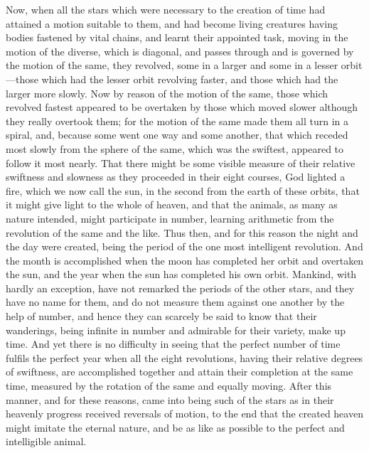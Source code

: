 \documentclass[11pt,letter]{article}
\begin{document}
\par  Now, when all the stars which were necessary to the creation of time had attained a motion suitable to them, and had become living creatures having bodies fastened by vital chains, and learnt their appointed task, moving in the motion of the diverse, which is diagonal, and passes through and is governed by the motion of the same, they revolved, some in a larger and some in a lesser orbit—those which had the lesser orbit revolving faster, and those which had the larger more slowly. Now by reason of the motion of the same, those which revolved fastest appeared to be overtaken by those which moved slower although they really overtook them; for the motion of the same made them all turn in a spiral, and, because some went one way and some another, that which receded most slowly from the sphere of the same, which was the swiftest, appeared to follow it most nearly. That there might be some visible measure of their relative swiftness and slowness as they proceeded in their eight courses, God lighted a fire, which we now call the sun, in the second from the earth of these orbits, that it might give light to the whole of heaven, and that the animals, as many as nature intended, might participate in number, learning arithmetic from the revolution of the same and the like. Thus then, and for this reason the night and the day were created, being the period of the one most intelligent revolution. And the month is accomplished when the moon has completed her orbit and overtaken the sun, and the year when the sun has completed his own orbit. Mankind, with hardly an exception, have not remarked the periods of the other stars, and they have no name for them, and do not measure them against one another by the help of number, and hence they can scarcely be said to know that their wanderings, being infinite in number and admirable for their variety, make up time. And yet there is no difficulty in seeing that the perfect number of time fulfils the perfect year when all the eight revolutions, having their relative degrees of swiftness, are accomplished together and attain their completion at the same time, measured by the rotation of the same and equally moving. After this manner, and for these reasons, came into being such of the stars as in their heavenly progress received reversals of motion, to the end that the created heaven might imitate the eternal nature, and be as like as possible to the perfect and intelligible animal.
\end{document}
